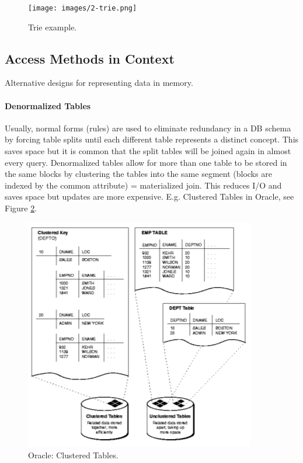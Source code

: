 \begin{figure}[h]
	\centering
	\texttt{[image: images/2-trie.png]}
	\caption{Trie example.}
	\label{fig:trie}
\end{figure}





\subsection{Access Methods in Context}

Alternative designs for representing data in memory.

\paragraph{Denormalized Tables}
Usually, normal forms (rules) are used to eliminate redundancy in a DB schema by forcing table splits until each different table represents a distinct concept. This saves space but it is common that the split tables will be joined again in almost every query. Denormalized tables allow for more than one table to be stored in the same blocks by clustering the tables into the same segment (blocks are indexed by the common attribute) = materialized join. This reduces I/O and saves space but updates are more expensive. E.g. Clustered Tables in Oracle, see Figure \ref{fig:cluster}.

\begin{figure}[h]
	\centering
	\includegraphics[scale=0.8]{images/2-cluster.PNG}
	\caption{Oracle: Clustered Tables.}
	\label{fig:cluster}
\end{figure}

